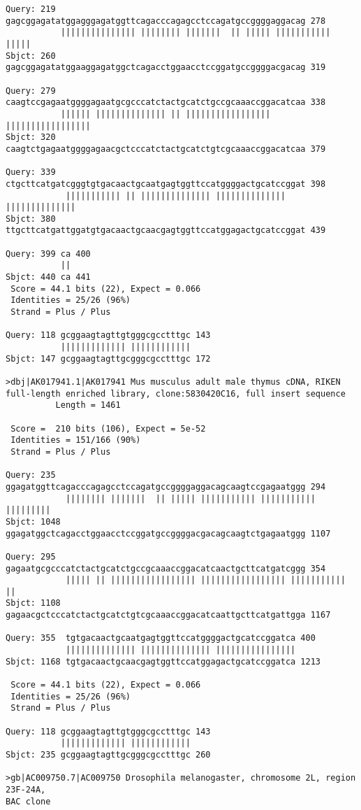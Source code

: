 \begin{lstlisting}
Query: 219 gagcggagatatggagggagatggttcagacccagagcctccagatgccggggaggacag 278
           ||||||||||||||| |||||||| |||||||  || ||||| ||||||||||| |||||
Sbjct: 260 gagcggagatatggaaggagatggctcagacctggaacctccggatgccggggacgacag 319

Query: 279 caagtccgagaatggggagaatgcgcccatctactgcatctgccgcaaaccggacatcaa 338
           |||||| |||||||||||||| || ||||||||||||||||| |||||||||||||||||
Sbjct: 320 caagtctgagaatggggagaacgctcccatctactgcatctgtcgcaaaccggacatcaa 379

Query: 339 ctgcttcatgatcgggtgtgacaactgcaatgagtggttccatggggactgcatccggat 398
            ||||||||||| || |||||||||||||| |||||||||||||| ||||||||||||||
Sbjct: 380 ttgcttcatgattggatgtgacaactgcaacgagtggttccatggagactgcatccggat 439

Query: 399 ca 400
           ||
Sbjct: 440 ca 441
 Score = 44.1 bits (22), Expect = 0.066
 Identities = 25/26 (96%)
 Strand = Plus / Plus

Query: 118 gcggaagtagttgtgggcgcctttgc 143
           ||||||||||||| ||||||||||||
Sbjct: 147 gcggaagtagttgcgggcgcctttgc 172

>dbj|AK017941.1|AK017941 Mus musculus adult male thymus cDNA, RIKEN
full-length enriched library, clone:5830420C16, full insert sequence
          Length = 1461

 Score =  210 bits (106), Expect = 5e-52
 Identities = 151/166 (90%)
 Strand = Plus / Plus

Query: 235  ggagatggttcagacccagagcctccagatgccggggaggacagcaagtccgagaatggg 294
            |||||||| |||||||  || ||||| ||||||||||| ||||||||||| |||||||||
Sbjct: 1048 ggagatggctcagacctggaacctccggatgccggggacgacagcaagtctgagaatggg 1107

Query: 295  gagaatgcgcccatctactgcatctgccgcaaaccggacatcaactgcttcatgatcggg 354
            ||||| || ||||||||||||||||| ||||||||||||||||| ||||||||||| ||
Sbjct: 1108 gagaacgctcccatctactgcatctgtcgcaaaccggacatcaattgcttcatgattgga 1167

Query: 355  tgtgacaactgcaatgagtggttccatggggactgcatccggatca 400
            |||||||||||||| |||||||||||||| ||||||||||||||||
Sbjct: 1168 tgtgacaactgcaacgagtggttccatggagactgcatccggatca 1213

 Score = 44.1 bits (22), Expect = 0.066
 Identities = 25/26 (96%)
 Strand = Plus / Plus

Query: 118 gcggaagtagttgtgggcgcctttgc 143
           ||||||||||||| ||||||||||||
Sbjct: 235 gcggaagtagttgcgggcgcctttgc 260

>gb|AC009750.7|AC009750 Drosophila melanogaster, chromosome 2L, region 23F-24A,
BAC clone



\end{lstlisting}
